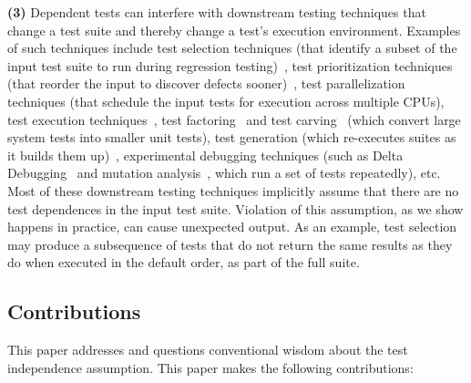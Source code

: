\textbf{(3)}
Dependent tests can interfere with downstream testing
techniques that change a test suite and thereby change a test's execution environment.
Examples of such techniques include
test selection techniques (that identify a subset of
the input test suite to run during
regression testing)~\cite{harroldetal:OOPSLA:2001},
test prioritization techniques (that reorder the
input to discover defects sooner)~\cite{Elbaum:2000:PTC:347324.348910},
test parallelization techniques (that schedule the input tests for execution across multiple
CPUs), test execution techniques~\cite{Misailovic:2007, SPLAT},
test factoring~\cite{Saff:2005} and test carving~\cite{Elbaum:2006} (which
convert large system tests into smaller unit tests),
test generation (which re-executes suites as it builds them up)~\cite{PachecoE2005,RobinsonEPAL2011},
experimental debugging techniques (such as Delta
Debugging~\cite{Zeller:2002} and mutation analysis~\cite{Schuler:2009:EMT},
which run a set of tests repeatedly), etc. 
Most of these downstream testing techniques implicitly assume that
there are no test dependences in the input test suite. Violation of
this assumption, as we show happens in practice, can cause unexpected
output. %
As an example, test selection may produce a subsequence of tests that do not
return the same results as they do when executed in
the default order, as part of the full suite.


\subsection{Contributions}
\label{sec:contributions}

This paper addresses and questions
conventional wisdom about the test independence assumption. 
This paper makes the following contributions:

